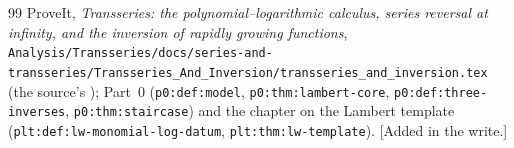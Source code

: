 \documentclass[11pt,letterpaper]{article}
\theoremstyle{remark}\newtheorem{remark}[theorem]{Remark}
\newcommand{\file}[1]{\nolinkurl{#1}}
\begin{document}
\begin{thebibliography}{99}
 ProveIt, \emph{Transseries: the polynomial--logarithmic calculus, series reversal at infinity, and the inversion of rapidly growing functions}, \file{Analysis/Transseries/docs/series-and-transseries/Transseries_And_Inversion/transseries_and_inversion.tex} (the source's \cite{canonical}); Part~0 (\file{p0:def:model}, \file{p0:thm:lambert-core}, \file{p0:def:three-inverses}, \file{p0:thm:staircase}) and the chapter on the Lambert template (\file{plt:def:lw-monomial-log-datum}, \file{plt:thm:lw-template}). [Added in the write.]
\end{thebibliography}
\end{document}
